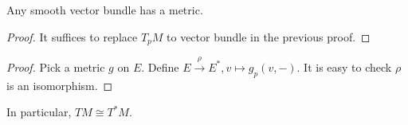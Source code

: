 \begin{proposition}
    Any smooth vector bundle has a metric.
\end{proposition}
\begin{proof}
    It suffices to replace $ T_pM  $ to vector bundle in the previous proof.
\end{proof}
\begin{proof}
    Pick a metric  $ g  $ on  $ E  $. Define  $ E\xrightarrow{\rho}E^*,v\mapsto g_p(v,-) $. It is easy to check  $ \rho  $ is an isomorphism.  
\end{proof}
In particular,  $ TM\cong T^*M $.

